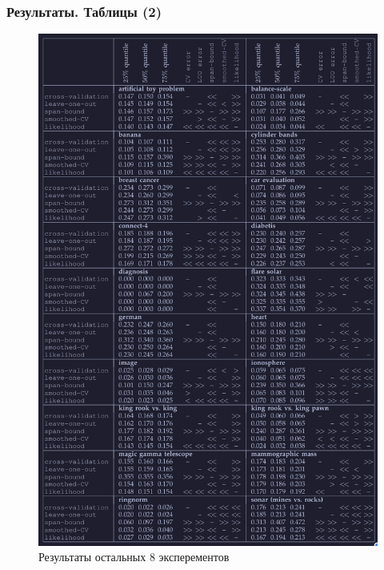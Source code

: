 \documentclass{beamer}
\begin{document}
\begin{frame}
	\frametitle{Результаты. Таблицы (2)}
	\begin{figure}
		\centering
		\includegraphics[height=0.8\textheight]{winner-true.png}
		\caption{Результаты остальных 8 эксперементов}
	\end{figure}

\end{frame}
\end{document}
